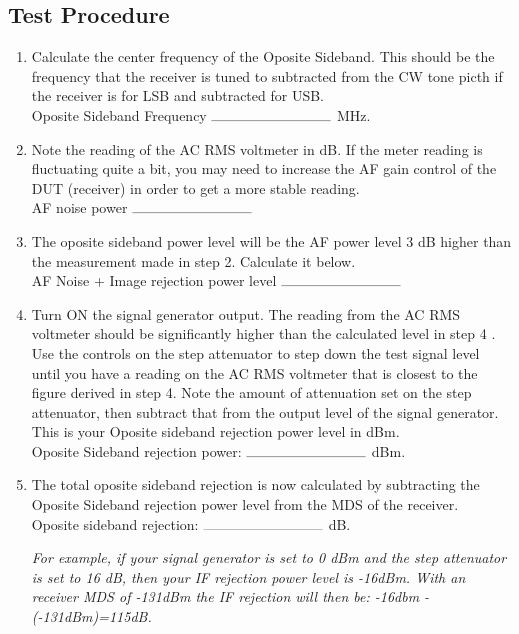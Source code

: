 \documentclass[10pt,letterpaper]{book}
\begin{document}
\subsection*{Test Procedure}
\begin{enumerate}
	\item Calculate the center frequency of the Oposite Sideband. This should be the frequency that the receiver is tuned to subtracted from the CW tone picth if the receiver is for LSB and subtracted for USB.
	\vspace{30pt}
	\\Oposite Sideband Frequency $\rule{3cm}{0.1mm}$ MHz.

	\item Note the reading of the AC RMS voltmeter in dB. If the meter reading is fluctuating quite a bit, you may need to increase the AF gain control of the DUT (receiver) in order to get a more stable reading.
	\vspace{30pt}
	\\AF noise power $\rule{3cm}{0.1mm}$ 

	\item  The oposite sideband power level will be the AF power level 3 dB higher than the measurement made in step 2. Calculate it below.
	\vspace{30pt}
	\\AF Noise + Image rejection power level $\rule{3cm}{0.1mm}$ 

	\item Turn ON the signal generator output. The reading from the AC RMS voltmeter should be significantly higher than the calculated level in step 4 . Use the controls on the step attenuator to step down the test signal level until you have a reading on the AC RMS voltmeter that is closest to the figure derived in step 4. Note the amount of attenuation set on the step attenuator, then subtract that from the output level of the signal generator. This is your Oposite sideband rejection power level in dBm.
	\vspace{30pt}
	\\Oposite Sideband rejection power: $\rule{3cm}{0.1mm}$ dBm.
	 
	\item  The total oposite sideband rejection is now calculated by subtracting the Oposite Sideband rejection power level from the MDS of the receiver.
	\vspace{30pt}
	 \\Oposite sideband rejection: $\rule{3cm}{0.1mm}$ dB.

	\emph{For example, if your signal generator is set to 0 dBm and the step attenuator is set to 16 dB, then your IF rejection power level is -16dBm. With an receiver MDS of -131dBm the IF rejection will then be: -16dbm -(-131dBm)=115dB.}
\end{enumerate}
\end{document}
